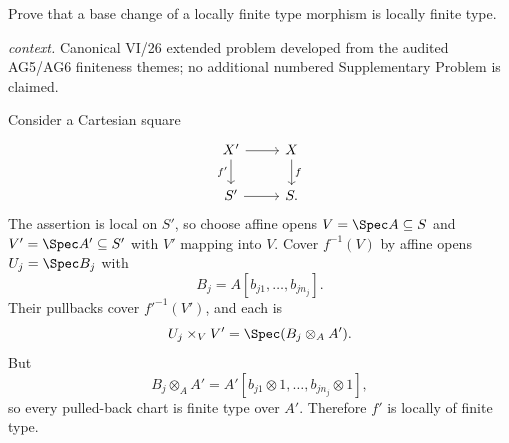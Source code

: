 \begin{problem}\label{prob:vi26-p08}
Prove that a base change of a locally finite type morphism is locally finite type.
\par\smallskip\noindent\textit{context.} Canonical VI/26 extended problem developed from the audited AG5/AG6 finiteness themes; no additional numbered Supplementary Problem is claimed.
\end{problem}

\ifdefined\FullProblemDossiers
\begin{solution}
Consider a Cartesian square
\[
\begin{tikzcd}
X' \arrow[r] \arrow[d,"f'"'] & X \arrow[d,"f"]\\
S' \arrow[r] & S.
\end{tikzcd}
\]
The assertion is local on \(S'\), so choose affine opens \(V=\Spec A\subseteq S\) and
\(V'=\Spec A'\subseteq S'\) with \(V'\) mapping into \(V\).  Cover \(f^{-1}(V)\) by affine opens
\(U_j=\Spec B_j\) with
\[
B_j=A[b_{j1},\ldots,b_{jn_j}].
\]
Their pullbacks cover \(f'^{-1}(V')\), and each is
\[
U_j\times_VV'
=
\Spec(B_j\otimes_AA').
\]
But
\[
B_j\otimes_AA'
=
A'[b_{j1}\otimes1,\ldots,b_{jn_j}\otimes1],
\]
so every pulled-back chart is finite type over \(A'\).  Therefore \(f'\) is locally of finite type.
\end{solution}
\fi
